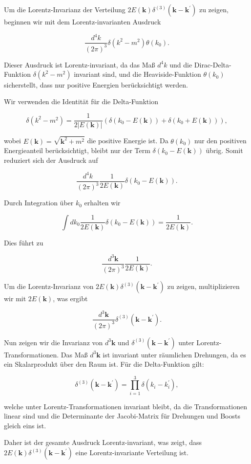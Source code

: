 Um die Lorentz-Invarianz der Verteilung \(2 E(\mathbf{k}) \delta^{(3)}\left(\mathbf{k}-\mathbf{k}^{\prime}\right)\) zu zeigen, beginnen wir mit dem Lorentz-invarianten Ausdruck

\[
\frac{d^4 k}{(2 \pi)^3} \delta\left(k^2-m^2\right) \theta\left(k_0\right).
\]

Dieser Ausdruck ist Lorentz-invariant, da das Maß \(d^4 k\) und die Dirac-Delta-Funktion \(\delta\left(k^2-m^2\right)\) invariant sind, und die Heaviside-Funktion \(\theta\left(k_0\right)\) sicherstellt, dass nur positive Energien berücksichtigt werden.

Wir verwenden die Identität für die Delta-Funktion

\[
\delta\left(k^2-m^2\right) = \frac{1}{2|E(\mathbf{k})|} \left( \delta\left(k_0 - E(\mathbf{k})\right) + \delta\left(k_0 + E(\mathbf{k})\right) \right),
\]

wobei \(E(\mathbf{k}) = \sqrt{\mathbf{k}^2 + m^2}\) die positive Energie ist. Da \(\theta(k_0)\) nur den positiven Energieanteil berücksichtigt, bleibt nur der Term \(\delta\left(k_0 - E(\mathbf{k})\right)\) übrig. Somit reduziert sich der Ausdruck auf

\[
\frac{d^4 k}{(2 \pi)^3} \frac{1}{2 E(\mathbf{k})} \delta\left(k_0 - E(\mathbf{k})\right).
\]

Durch Integration über \(k_0\) erhalten wir

\[
\int dk_0 \frac{1}{2 E(\mathbf{k})} \delta(k_0 - E(\mathbf{k})) = \frac{1}{2 E(\mathbf{k})}.
\]

Dies führt zu

\[
\frac{d^3 \mathbf{k}}{(2 \pi)^3} \frac{1}{2 E(\mathbf{k})}.
\]

Um die Lorentz-Invarianz von \(2 E(\mathbf{k}) \delta^{(3)}\left(\mathbf{k}-\mathbf{k}^{\prime}\right)\) zu zeigen, multiplizieren wir mit \(2 E(\mathbf{k})\), was ergibt

\[
\frac{d^3 \mathbf{k}}{(2 \pi)^3} \delta^{(3)}\left(\mathbf{k}-\mathbf{k}^{\prime}\right).
\]

Nun zeigen wir die Invarianz von \(d^3 \mathbf{k}\) und \(\delta^{(3)}\left(\mathbf{k}-\mathbf{k}^{\prime}\right)\) unter Lorentz-Transformationen. Das Maß \(d^3 \mathbf{k}\) ist invariant unter räumlichen Drehungen, da es ein Skalarprodukt über den Raum ist. Für die Delta-Funktion gilt:

\[
\delta^{(3)}\left(\mathbf{k}-\mathbf{k}^{\prime}\right) = \prod_{i=1}^{3} \delta\left(k_i - k_i^{\prime}\right),
\]

welche unter Lorentz-Transformationen invariant bleibt, da die Transformationen linear sind und die Determinante der Jacobi-Matrix für Drehungen und Boosts gleich eins ist.

Daher ist der gesamte Ausdruck Lorentz-invariant, was zeigt, dass \(2 E(\mathbf{k}) \delta^{(3)}\left(\mathbf{k}-\mathbf{k}^{\prime}\right)\) eine Lorentz-invariante Verteilung ist.

